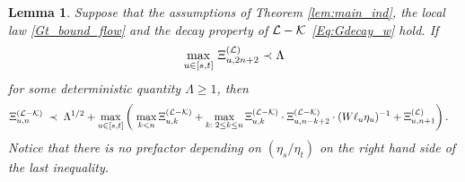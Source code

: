 \documentclass[10pt,reqno]{article}
\theoremstyle{plain} %
\newtheorem{lemma}[theorem]{Lemma}
\theoremstyle{remark}
\numberwithin{equation}{section}
\begin{document}
\begin{lemma}\label{lem:STOeq_Qt} 
Suppose that  the assumptions of 
 Theorem \ref{lem:main_ind},  the local law \eqref{Gt_bound_flow} and the decay property of $\cal L-\cal K$ \eqref{Eq:Gdecay_w} hold. 
If 
 $$
 \max_{u\in [s,t]}\, \Xi^{(\cal L)}_{u, {2n+2}}\prec {  \Lambda}
 $$
 for some deterministic quantity $ \Lambda \ge 1$, 
then 
\begin{align}\label{am;asoi222}
 \Xi^{({\cal L-\cal K})}_{u,n}
 \;\prec\;  &\; { \Lambda}^{1/2}+\max_{u\in [s,t]}
  \left(\; \max_{k<n }\Xi^{({\cal L-\cal K})}_{u,k}+\max_{k:\;2\le k\le n }\Xi^{({\cal L-\cal K})}_{u,k}\cdot \Xi^{({\cal L-\cal K})}_{u,n-k+2}\cdot(W\ell_u\eta_u)^{-1}+\Xi^{({\cal L})}_{u,n+1}\right).
\end{align}
Notice that  there is no prefactor depending on  $(\eta_s/\eta_t)$ on the right hand side of the last inequality.
\end{lemma}
\end{document}
